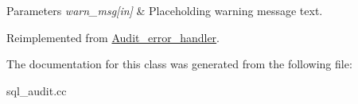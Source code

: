 \begin{DoxyParams}{Parameters}
{\em warn\+\_\+msg\mbox{[}in\mbox{]}} & Placeholding warning message text. \\
\hline
\end{DoxyParams}


Reimplemented from \mbox{\hyperlink{classAudit__error__handler_ac3b06f010e4c72aee47ae6123e49ecc4}{Audit\+\_\+error\+\_\+handler}}.



The documentation for this class was generated from the following file\+:\begin{DoxyCompactItemize}
\item 
sql\+\_\+audit.\+cc\end{DoxyCompactItemize}
